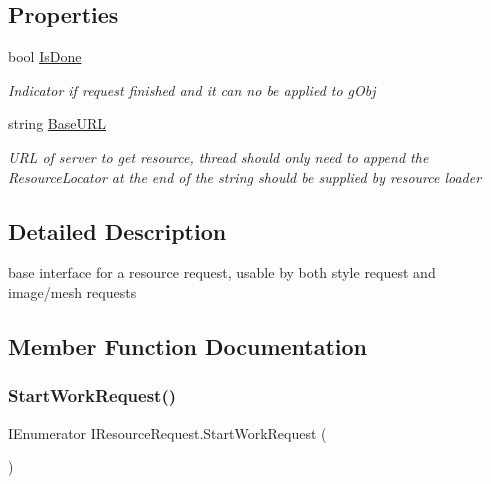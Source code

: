 \subsection*{Properties}
\begin{DoxyCompactItemize}
\item 
bool \mbox{\hyperlink{interface_i_resource_request_a3f805c8d561c119c795598b98611fb90}{Is\+Done}}
\begin{DoxyCompactList}\small\item\em Indicator if request finished and it can no be applied to g\+Obj \end{DoxyCompactList}\item 
string \mbox{\hyperlink{interface_i_resource_request_a6da6ac392229cc1a8a09d420ee4357dd}{Base\+U\+RL}}
\begin{DoxyCompactList}\small\item\em U\+RL of server to get resource, thread should only need to append the Resource\+Locator at the end of the string should be supplied by resource loader \end{DoxyCompactList}\end{DoxyCompactItemize}


\subsection{Detailed Description}
base interface for a resource request, usable by both style request and image/mesh requests 



\subsection{Member Function Documentation}
\mbox{\label{interface_i_resource_request_a5b40a09cb820283600ac9e3f846936f9}} 
\subsubsection{\texorpdfstring{Start\+Work\+Request()}{StartWorkRequest()}}
{\footnotesize\ttfamily I\+Enumerator I\+Resource\+Request.\+Start\+Work\+Request (\begin{DoxyParamCaption}{ }\end{DoxyParamCaption})}



